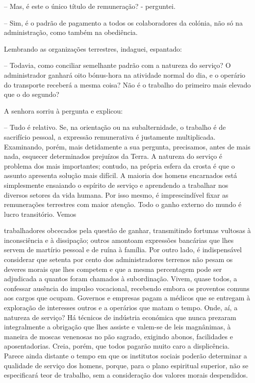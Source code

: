 \documentclass[portuguese,12pt,a4paper]{scrbook}
\begin{document}
	– Mas, é este o único título de remuneração? - perguntei.
	
	– Sim, é o padrão de pagamento a todos os colaboradores da colónia, não só na administração, como também na obediência.
	
	Lembrando as organizações terrestres, indaguei, espantado:
	
	– Todavia, como conciliar semelhante padrão com a natureza do serviço? O administrador ganhará oito bónus-hora na atividade normal do dia, e o operário do transporte receberá a mesma coisa? Não é o trabalho do primeiro mais elevado que o do segundo?
	
	A senhora sorriu à pergunta e explicou:
	
	– Tudo é relativo. Se, na orientação ou na subalternidade, o trabalho é de sacrifício pessoal, a expressão remunerativa é justamente multiplicada. Examinando, porém, mais detidamente a sua pergunta, precisamos, antes de mais nada, esquecer determinados prejuízos da Terra. A natureza do serviço é problema dos mais importantes; contudo, na própria esfera da crosta é que o assunto apresenta solução mais difícil. A maioria dos homens encarnados está simplesmente ensaiando o espírito de serviço e aprendendo a trabalhar nos diversos setores da vida humana. Por isso mesmo, é imprescindível fixar as remunerações terrestres com maior atenção. Todo o ganho externo do mundo é lucro transitório. Vemos
	
	
	trabalhadores obcecados pela questão de ganhar, transmitindo fortunas vultosas à inconsciência e à dissipação; outros amontoam expressões bancárias que lhes servem de martírio pessoal e de ruína à família. Por outro lado, é indispensável considerar que setenta por cento dos administradores terrenos não pesam os deveres morais que lhes competem e que a mesma percentagem pode ser adjudicada a quantos foram chamados à subordinação. Vivem, quase todos, a confessar ausência do impulso vocacional, recebendo embora os proventos comuns aos cargos que ocupam. Governos e empresas pagam a médicos que se entregam à exploração de interesses outros e a operários que matam o tempo. Onde, aí, a natureza de serviço? Há técnicos de indústria económica que nunca prezaram integralmente a obrigação que lhes assiste e valem-se de leis magnânimas, à maneira de moscas venenosas no pão sagrado, exigindo abonos, facilidades e aposentadorias. Creia, porém, que todos pagarão muito caro a displicência. Parece ainda distante o tempo em que os institutos sociais poderão determinar a qualidade de serviço dos homens, porque, para o plano espiritual superior, não se especificará teor de trabalho, sem a consideração dos valores morais despendidos.
	
\end{document}
